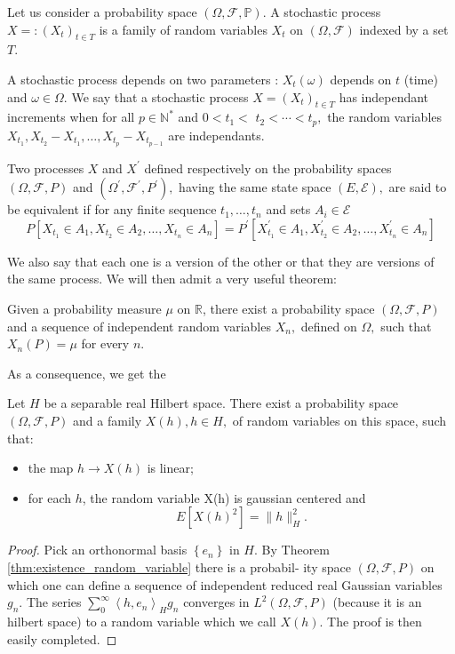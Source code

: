 \begin{definition}
	Let us consider a probability space $(\Omega,\mathscr{F}, \mathbb{P})$. A stochastic process  $X=:\left(X_{t}\right)_{t \in T}$ is a family of random variables $X_{t}$ on $(\Omega,\mathscr{F})$ indexed by a set $T$.

	A stochastic process depends on two parameters : $X_{t}(\omega)$ depends on $t$ (time) and $\omega \in \Omega$.
	We say that a stochastic process $X=\left(X_{t}\right)_{t \in T}$ has independant increments when for all $p \in \mathbb{N}^{*} $ and $0<t_{1}<$
	$t_{2}<\cdots<t_{p},$ the random variables $X_{t_{1}}, X_{t_{2}}-X_{t_{1}}, \ldots, X_{t_{p}}-X_{t_{p-1}}$ are independants.
\end{definition}
\begin{definition}
	Two processes $X$ and $X^{\prime}$ defined respectively on the probability spaces $(\Omega, \mathscr{F}, P)$ and $\left(\Omega^{\prime}, \mathcal{F}^{\prime}, P^{\prime}\right),$ having the same state space $(E, \mathscr{E}),$ are said
	to be equivalent if for any finite sequence $t_{1}, \ldots, t_{n}$ and sets $A_{i} \in \mathscr{E}$
	\[
	P\left[X_{t_{1}} \in A_{1}, X_{t_{2}} \in A_{2}, \ldots, X_{t_{n}} \in A_{n}\right]=P^{\prime}\left[X_{t_{1}}^{\prime} \in A_{1}, X_{t_{2}}^{\prime} \in A_{2}, \ldots, X_{t_{n}}^{\prime} \in A_{n}\right]
	\]
\end{definition}
We also say that each one is a version of the other or that they are versions of the same process.
We will then admit a very useful theorem:
\begin{theorem}\label{thm:existence_random_variable}
	Given a probability measure $\mu$ on $\mathbb{R}$, there exist a probability
	space $(\Omega, \mathscr{F}, P)$ and a sequence of independent random variables $X_{n},$ defined on
	$\Omega,$ such that $X_{n}(P)=\mu$ for every $n .$
\end{theorem}
As a consequence, we get the
\begin{proposition}
	Let $H$ be a separable real Hilbert space. There exist a probability space $(\Omega, \mathscr{F}, P)$ and a family $X(h), h \in H,$ of random variables on this space, such that:
	\begin{itemize}
		\item the map $h\rightarrow X(h)$ is linear;
		\item for each $h$, the random variable X(h) is gaussian centered and
		$$
		E\left[X(h)^{2}\right]=\|h\|_{H}^{2} .
		$$
	\end{itemize}

\end{proposition}
\begin{proof}
	 Pick an orthonormal basis $\left\{e_{n}\right\}$ in $H .$ By Theorem \eqref{thm:existence_random_variable} there is a probabil-
	ity space $(\Omega, \mathscr{F}, P)$ on which one can define a sequence of independent reduced
	real Gaussian variables $g_{n} .$ The series $\sum_{0}^{\infty}\left\langle h, e_{n}\right\rangle_{H} g_{n}$ converges in $L^{2}(\Omega, \mathscr{F}, P)$  (because it is an hilbert space) to a random variable which we call $X(h) .$ The proof is then easily completed.

\end{proof}

